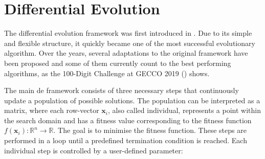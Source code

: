 \documentclass[./\jobname.tex]{subfiles}
\begin{document}
\section{Differential Evolution}

The differential evolution framework was first introduced in \cite{storn_differential_1997}. Due to its simple and flexible structure, it quickly became one of the most successful evolutionary algorithm. Over the years, several adaptations to the original framework have been proposed and some of them currently count to the best performing algorithms, as the 100-Digit Challenge at GECCO 2019 (\cite{suganthan_suganthancec2019_2020}) shows. 

The main \gls{de} framework consists of three necessary steps that continuously update a population of possible solutions. The population can be interpreted as a matrix, where each row-vector $\mathbf{x}_i$, also called individual, represents a point within the search domain and has a fitness value corresponding to the fitness function $f(\mathbf{x}_i): \mathbb{R}^n \rightarrow \mathbb{R}$. The goal is to minimise the fitness function. These steps are performed in a loop until a predefined termination condition is reached. Each individual step is controlled by a user-defined parameter: 
\end{document}

